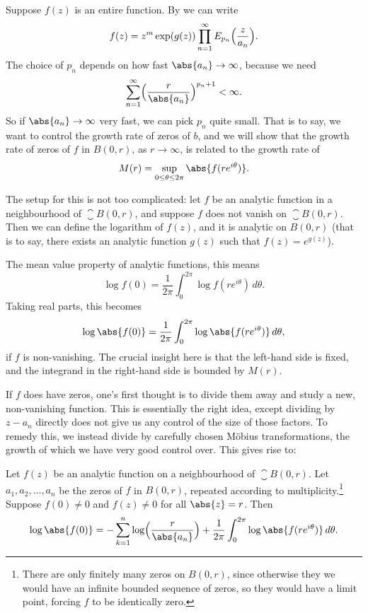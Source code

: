 


Suppose $f(z)$ is an entire function.
By  we can write
\[
	f(z) = z^m \exp(g(z)) \prod_{n = 1}^\infty E_{p_n}\Bigl(\frac{z}{a_n}\Bigr).
\]
The choice of $p_n$ depends on how fast $\abs{a_n} \to \infty$, because we need
\[
	\sum_{n = 1}^\infty \Bigl( \frac{r}{\abs{a_n}} \Bigr)^{p_n + 1} < \infty.
\]
So if $\abs{a_n} \to \infty$ very fast, we can pick $p_n$ quite small.
That is to say, we want to control the growth rate of zeros of $b$, and we will show that the growth rate of zeros of $f$ in $B(0, r)$, as $r \to \infty$, is related to the growth rate of
\[
	M(r) = \sup_{0 \leq \theta \leq 2 \pi} \abs{f(r e^{i \theta})}.
\]

The setup for this is not too complicated: let $f$ be an analytic function in a neighbourhood of $\closure{B(0, r)}$, and suppose $f$ does not vanish on $\closure{B(0, r)}$.
Then we can define the logarithm of $f(z)$, and it is analytic on $B(0, r)$ (that is to say, there exists an analytic function $g(z)$ such that $f(z) = e^{g(z)}$).

The mean value property of analytic functions, this means
\[
	\log f(0) = \frac{1}{2 \pi} \int_0^{2 \pi} \log f(r e^{i \theta}) \, d \theta.
\]
Taking real parts, this becomes
\[
	\log \abs{f(0)} = \frac{1}{2 \pi} \int_0^{2 \pi} \log \abs{f(r e^{i \theta})} \, d \theta,
\]
if $f$ is non-vanishing.
The crucial insight here is that the left-hand side is fixed, and the integrand in the right-hand side is bounded by $M(r)$.

If $f$ does have zeros, one's first thought is to divide them away and study a new, non-vanishing function.
This is essentially the right idea, except dividing by $z - a_n$ directly does not give us any control of the size of those factors.
To remedy this, we instead divide by carefully chosen Möbius transformations, the growth of which we have very good control over.
This gives rise to:

\begin{theorem}\label{thm8.11}
	Let $f(z)$ be an analytic function on a neighbourhood of $\closure{B(0, r)}$.
	Let $a_1, a_2, \dots, a_n$ be the zeros of $f$ in $B(0, r)$, repeated according to multiplicity.\footnote{There are only finitely many zeros on $B(0, r)$, since otherwise they we would have an infinite bounded sequence of zeros, so they would have a limit point, forcing $f$ to be identically zero.}
	Suppose $f(0) \neq 0$ and $f(z) \neq 0$ for all $\abs{z} = r$.
	Then
	\[
		\log \abs{f(0)} = - \sum_{k = 1}^n \log \Bigl(\frac{r}{\abs{a_n}} \Bigr) + \frac{1}{2 \pi} \int_0^{2 \pi} \log \abs{f(r e^{i \theta})} \, d \theta.
	\]
\end{theorem}

